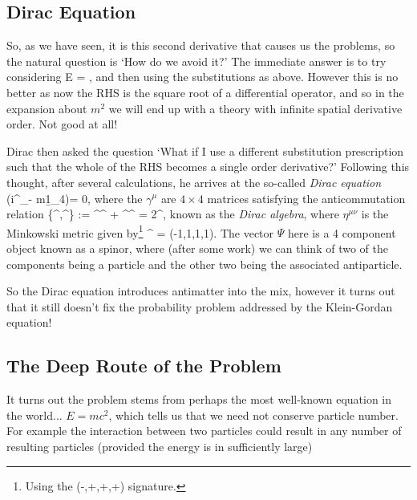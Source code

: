 \subsection{Dirac Equation}

So, as we have seen, it is this second derivative that causes us the problems, so the natural question is `How do we avoid it?' The immediate answer is to try considering 
\bse 
E = ,
\ese 
and then using the substitutions as above. However this is no better as now the RHS is the square root of a differential operator, and so in the expansion about $m^2$ we will end up with a theory with infinite spatial derivative order. Not good at all! 

Dirac then asked the question `What if I use a different substitution prescription such that the whole of the RHS becomes a single order derivative?' Following this thought, after several calculations, he arrives at the so-called \emph{Dirac equation} 
\bse 
(i\gamma^\mu\partial_\mu - m\b1_4)\Psi = 0,
\ese 
where the $\gamma^{\mu}$ are $4\times4$ matrices satisfying the anticommutation relation
\bse 
\{\gamma^{\mu},\gamma^{\nu}\} := \gamma^{\mu}\gamma^{\nu} + \gamma^{\mu}\gamma^{\nu} = 2\eta^{\mu\nu},
\ese 
known as the \emph{Dirac algebra}, where $\eta^{\mu\nu}$ is the Minkowski metric given by\footnote{Using the (-,+,+,+) signature.} 
\bse 
\eta^{\mu\nu} = (-1,1,1,1).
\ese 
The vector $\Psi$ here is a 4 component object known as a spinor, where (after some work) we can think of two of the components being a particle and the other two being the associated antiparticle. 

So the Dirac equation introduces antimatter into the mix, however it turns out that it still doesn't fix the probability problem addressed by the Klein-Gordan equation!

\subsection{The Deep Route of the Problem}

It turns out the problem stems from perhaps the most well-known equation in the world... $E=mc^2$, which tells us that we need not conserve particle number. For example the interaction between two particles could result in any number of resulting particles (provided the energy is in sufficiently large) 

\begin{center}
\end{center}

